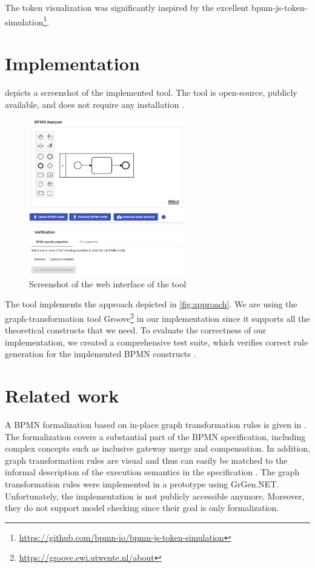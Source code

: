 \documentclass[adraft, copyright, creativecommons]{eptcs} %
\begin{document}
The token visualization was significantly inspired by the excellent bpmn-js-token-simulation\footnote{\url{https://github.com/bpmn-io/bpmn-js-token-simulation}}.
\section{Implementation} \label{sec:impl}
 depicts a screenshot of the implemented tool.
The tool is open-source, publicly available, and does not require any installation \cite{timkrauterArtifactsTERMGRAPH2022}.

\begin{figure}[h]
    \centering
    \includegraphics[width=0.6\textwidth]{images/impl.png}
    \caption{Screenshot of the web interface of the tool}
    \label{fig:implScreenshot}
\end{figure}

The tool implements the approach depicted in \cref{fig:approach}.
We are using the graph-transformation tool Groove\footnote{\url{https://groove.ewi.utwente.nl/about}} in our implementation \cite{ghamarianModellingAnalysisUsing2012} since it supports all the theoretical constructs that we need.
To evaluate the correctness of our implementation, we created a comprehensive test suite, which verifies correct rule generation for the implemented BPMN constructs \cite{timkrauterArtifactsTERMGRAPH2022}.

\section{Related work} \label{sec:relatedWork}
A BPMN formalization based on in-place graph transformation rules is given in \cite{vangorpVisualTokenbasedFormalization2013}.
The formalization covers a substantial part of the BPMN specification, including complex concepts such as inclusive gateway merge and compensation.
In addition, graph transformation rules are visual and thus can easily be matched to the informal description of the execution semantics in the specification \cite{objectmanagementgroupBusinessProcessModel2013}.
The graph transformation rules were implemented in a prototype using GrGen.NET.
Unfortunately, the implementation is not publicly accessible anymore.
Moreover, they do not support model checking since their goal is only formalization.
\end{document}
